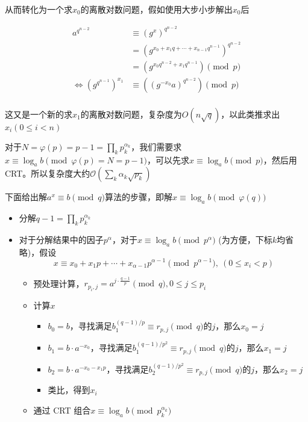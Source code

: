 \documentclass{article}
\begin{document}
从而转化为一个求$x_0$的离散对数问题，假如使用大步小步解出$x_0$后

\begin{equation}
    \begin{aligned}
        a^{q^{n-2}}&\equiv (g^x)^{q^{n-2}}\\
        &=(g^{x_0+x_1q+\cdots+x_{n-1}q^{n-1}})^{q^{n-2}}\\
        &=(g^{x_0q^{n-2}+ x_1q^{n-1}})\pmod{p}\\
        \Longleftrightarrow
        (g^{q^{n-1}})^{x_1}&\equiv ((g^{-x_0}a)^{q^{n-2}})\pmod{p}\\
    \end{aligned}
\end{equation}

这又是一个新的求$x_1$的离散对数问题，复杂度为$O(n\sqrt{q})$，以此类推求出$x_i (0\le i<n)$

对于$N=\varphi(p)=p-1=\prod_k p_k^{\alpha_k}$，我们需要求$x\equiv \log_a{b}\pmod{\varphi(p)=N=p-1}$，可以先求$x\equiv \log_a{b}\pmod{p}$，然后用 CRT。所以复杂度大约$\mathcal{O} (\sum_{k}\alpha_k\sqrt{p_k})$

下面给出解$a^x\equiv b\pmod{q}$算法的步骤，即解$x\equiv \log_a{b}\pmod{\varphi(q)}$

\begin{itemize}
    \item 分解$q-1=\prod_kp_k^{\alpha_k}$
    \item 对于分解结果中的因子$p^{\alpha}$，对于$x\equiv \log_a{b}\pmod{p^{\alpha}}$ (为方便，下标$k$均省略)，假设
    \begin{equation}
        x\equiv x_0+x_1p+\cdots+x_{\alpha-1}p^{{\alpha-1}}\pmod{p^{\alpha-1}},~(0\le x_i < p)
    \end{equation}

    \begin{itemize}
        \item 预处理计算，$r_{p_i,j}=a^{j\cdot\frac{q-1}{p}}\pmod{q},0\le j\le p_i$
        \item 计算$x$
            \begin{itemize}
            \item $b_0=b$，寻找满足$b_1^{(q-1)/p}\equiv r_{p,j}\pmod{q}$的$j$，那么$x_0=j$
            \item $b_1=b\cdot a^{-x_0}$，寻找满足$b_1^{(q-1)/p^2}\equiv r_{p,j}\pmod{q}$的$j$，那么$x_1=j$
            \item $b_2=b\cdot a^{-x_0-x_1p}$，寻找满足$b_2^{(q-1)/p^2}\equiv r_{p,j}\pmod{q}$的$j$，那么$x_2=j$
            \item 类比，得到$x_i$
            \end{itemize}
        \item 通过 CRT 组合$x\equiv \log_a{b}\pmod{p_k^{\alpha_k}}$
    \end{itemize}
    
\end{itemize}
\end{document}
